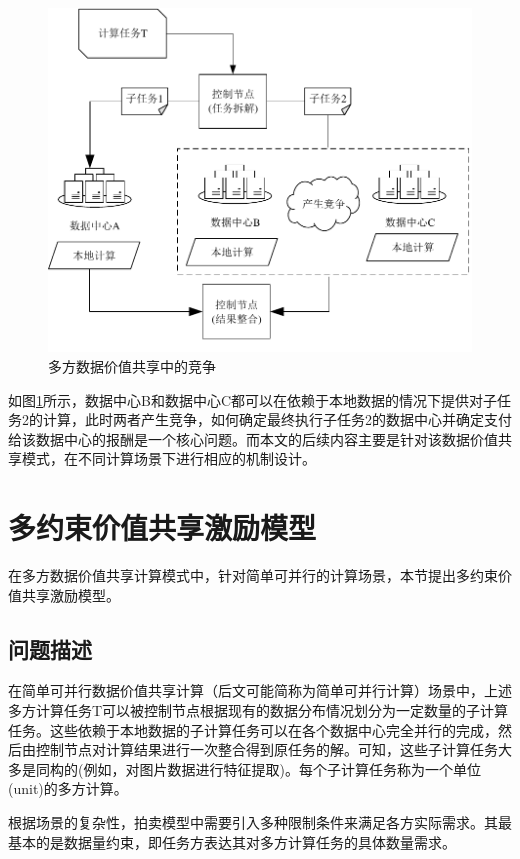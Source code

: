 \documentclass[promaster]{thesis-uestc}
\begin{document}
\begin{figure}[h]   
\includegraphics{pic/yuanweijili.pdf}
\caption{多方数据价值共享中的竞争}
\label{yuanweijili}
\end{figure}

如图\ref{yuanweijili}所示，数据中心B和数据中心C都可以在依赖于本地数据的情况下提供对子任务2的计算，此时两者产生竞争，如何确定最终执行子任务2的数据中心并确定支付给该数据中心的报酬是一个核心问题。而本文的后续内容主要是针对该数据价值共享模式，在不同计算场景下进行相应的机制设计。

\section{多约束价值共享激励模型}
在多方数据价值共享计算模式中，针对简单可并行的计算场景，本节提出多约束价值共享激励模型。
\subsection{问题描述}

在简单可并行数据价值共享计算（后文可能简称为简单可并行计算）场景中，上述多方计算任务T可以被控制节点根据现有的数据分布情况划分为一定数量的子计算任务。这些依赖于本地数据的子计算任务可以在各个数据中心完全并行的完成，然后由控制节点对计算结果进行一次整合得到原任务的解。可知，这些子计算任务大多是同构的(例如，对图片数据进行特征提取)。每个子计算任务称为一个单位(unit)的多方计算。

根据场景的复杂性，拍卖模型中需要引入多种限制条件来满足各方实际需求。其最基本的是数据量约束，即任务方表达其对多方计算任务的具体数量需求。
\end{document}
